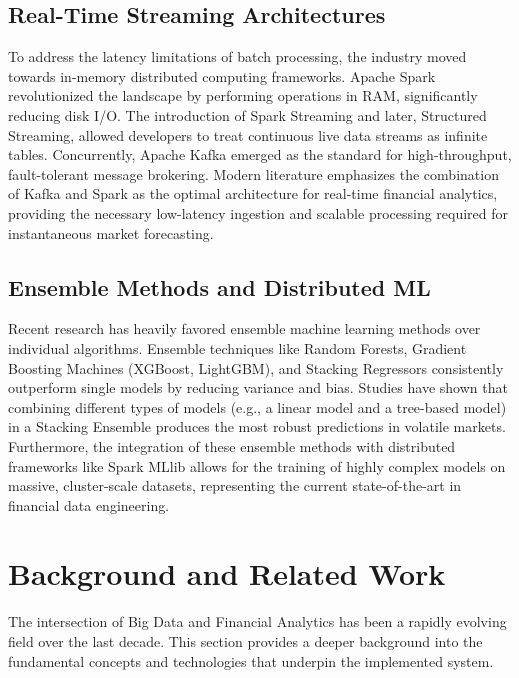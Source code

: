 \documentclass[12pt,a4paper]{report}
\begin{document}
\subsection{Real-Time Streaming Architectures}

To address the latency limitations of batch processing, the industry moved towards in-memory distributed computing frameworks. Apache Spark revolutionized the landscape by performing operations in RAM, significantly reducing disk I/O. The introduction of Spark Streaming and later, Structured Streaming, allowed developers to treat continuous live data streams as infinite tables. Concurrently, Apache Kafka emerged as the standard for high-throughput, fault-tolerant message brokering. Modern literature emphasizes the combination of Kafka and Spark as the optimal architecture for real-time financial analytics, providing the necessary low-latency ingestion and scalable processing required for instantaneous market forecasting.

\subsection{Ensemble Methods and Distributed ML}

Recent research has heavily favored ensemble machine learning methods over individual algorithms. Ensemble techniques like Random Forests, Gradient Boosting Machines (XGBoost, LightGBM), and Stacking Regressors consistently outperform single models by reducing variance and bias. Studies have shown that combining different types of models (e.g., a linear model and a tree-based model) in a Stacking Ensemble produces the most robust predictions in volatile markets. Furthermore, the integration of these ensemble methods with distributed frameworks like Spark MLlib allows for the training of highly complex models on massive, cluster-scale datasets, representing the current state-of-the-art in financial data engineering.

\clearpage

\section{Background and Related Work}

The intersection of Big Data and Financial Analytics has been a rapidly evolving field over the last decade. This section provides a deeper background into the fundamental concepts and technologies that underpin the implemented system.
\end{document}
